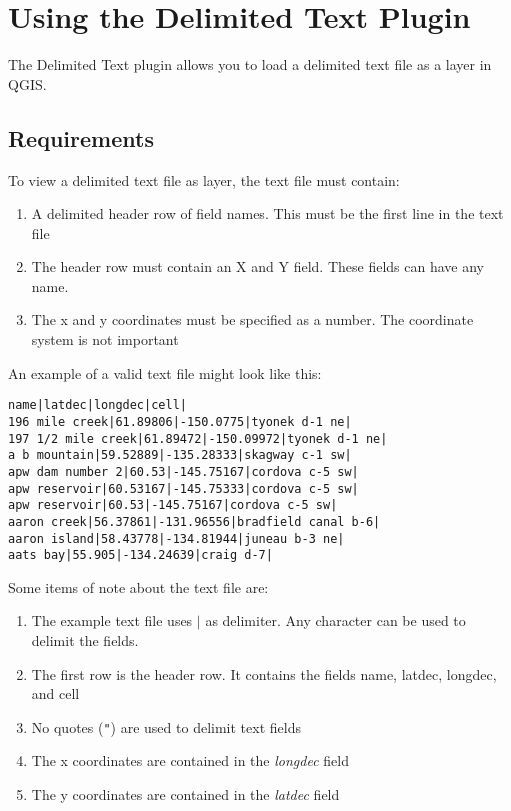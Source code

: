     
\section{Using the Delimited Text Plugin}
\label{f0}    

The Delimited Text plugin allows you to load a delimited text file  as a layer in QGIS. 
    
\subsection{Requirements}
To view a delimited text file as layer, the text file must contain:
\begin{enumerate}      
\item A delimited header row of field names. This must be the first line in the text file     \item The header row must contain an X and Y field. These fields can have any name.
\item The x and y coordinates must be specified as a number. The coordinate system is not important
\end{enumerate}
An example of a valid text file might look like this:
\begin{verbatim} 
name|latdec|longdec|cell|
196 mile creek|61.89806|-150.0775|tyonek d-1 ne|
197 1/2 mile creek|61.89472|-150.09972|tyonek d-1 ne|
a b mountain|59.52889|-135.28333|skagway c-1 sw|
apw dam number 2|60.53|-145.75167|cordova c-5 sw|
apw reservoir|60.53167|-145.75333|cordova c-5 sw|
apw reservoir|60.53|-145.75167|cordova c-5 sw|
aaron creek|56.37861|-131.96556|bradfield canal b-6|
aaron island|58.43778|-134.81944|juneau b-3 ne|
aats bay|55.905|-134.24639|craig d-7|
\end{verbatim}


Some items of note about the text file are:

\begin{enumerate}        
\item  The example text file uses \mbox{$|$} as delimiter. Any character can be used to         delimit the fields.
\item The first row is the header row. It contains the fields name, latdec, longdec, and cell
\item No quotes ({\tt{}"{}}) are used to delimit text fields
\item The x coordinates are contained in the {\em longdec} field
\item The y coordinates are contained in the {\em latdec} field
\end{enumerate}


